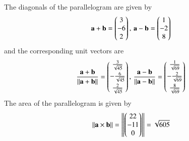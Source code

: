 The diagonals of the parallelogram are given by
\begin{align}
 \mathbf{a} + \mathbf{b} = \begin{pmatrix}3 \\-6\\2\end{pmatrix},\, 
 \mathbf{a} - \mathbf{b} = \begin{pmatrix}1 \\-2\\8\end{pmatrix}
\end{align}
and the corresponding unit vectors are
\begin{align}
	\frac{\mathbf{a} + \mathbf{b}}{\left\lVert\mathbf{a} + \mathbf{b}\right\rVert}  = \begin{pmatrix}\frac{3}{\sqrt{45}}\\[1ex]-\frac{6}{\sqrt{45}}\\[1ex]\frac{2}{\sqrt{45}}\end{pmatrix},\, 
	\frac{\mathbf{a} - \mathbf{b}}{\left\lVert\mathbf{a} - \mathbf{b}\right\rVert}  = \begin{pmatrix}\frac{1}{\sqrt{69}}\\[1ex]-\frac{2}{\sqrt{69}}\\[1ex]\frac{8}{\sqrt{69}}\end{pmatrix}
\end{align}
%
The area of the parallelogram is given by
\begin{align}
	\left\lVert\mathbf{a}\times\mathbf{b}\right\rVert  = \left\lVert\begin{pmatrix}22 \\-11\\0\end{pmatrix}\right\rVert = \sqrt{605}
\end{align}

